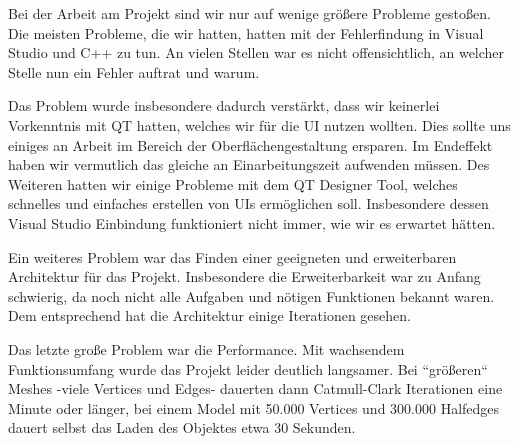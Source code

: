 
Bei der Arbeit am Projekt sind wir nur auf wenige grö\ss{}ere Probleme gesto\ss{}en. 
Die meisten Probleme, die wir hatten, hatten mit der Fehlerfindung in Visual Studio und C++ zu tun. 
An vielen Stellen war es nicht offensichtlich, an welcher Stelle nun ein Fehler auftrat und warum. 

Das Problem wurde insbesondere dadurch verstärkt, dass wir keinerlei Vorkenntnis mit QT hatten, welches wir für die UI nutzen wollten. 
Dies sollte uns einiges an Arbeit im Bereich der Oberflächengestaltung ersparen.
Im Endeffekt haben wir vermutlich das gleiche an Einarbeitungszeit aufwenden müssen. 
Des Weiteren hatten wir einige Probleme mit dem QT Designer Tool, welches schnelles und einfaches erstellen von UIs ermöglichen soll. 
Insbesondere dessen Visual Studio Einbindung funktioniert nicht immer, wie wir es erwartet hätten. 

Ein weiteres Problem war das Finden einer geeigneten und erweiterbaren Architektur für das Projekt. 
Insbesondere die Erweiterbarkeit war zu Anfang schwierig, da noch nicht alle Aufgaben und nötigen Funktionen bekannt waren.
Dem entsprechend hat die Architektur einige Iterationen gesehen.

Das letzte gro\ss{}e Problem war die Performance. 
Mit wachsendem Funktionsumfang wurde das Projekt leider deutlich langsamer. 
Bei ``grö\ss{}eren`` Meshes -viele Vertices und Edges- dauerten dann Catmull-Clark Iterationen eine Minute oder länger, bei einem Model mit 50.000 Vertices und 300.000 Halfedges dauert selbst das Laden des Objektes etwa 30 Sekunden.
